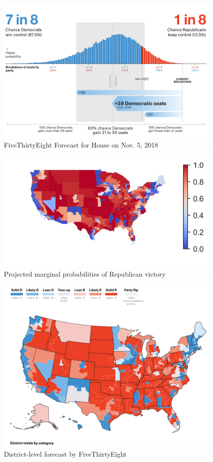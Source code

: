 \documentclass[11pt]{article}
\begin{document}
\begin{figure}[tbh]
  \centering
  \includegraphics[scale=0.4]{538_hist}
  \caption{FiveThirtyEight Forecast for House on Nov. 5, 2018}
  \label{fig:538_hist}
\end{figure}

\begin{figure}[tbh]
  \centering
  \includegraphics[scale=1.7]{projected_map.png}
  \caption{Projected marginal probabilities of Republican victory}
  \label{fig:proj_map}
\end{figure}

\begin{figure}[tbh]
  \centering
  \includegraphics[scale=0.45]{538_map}
  \caption{District-level forecast by FiveThirtyEight}
  \label{fig:538_map}
\end{figure}



\end{document}
